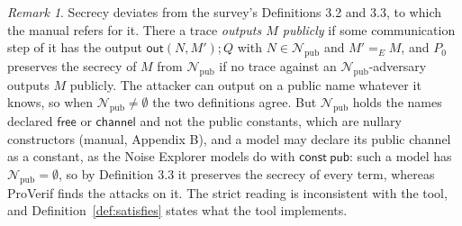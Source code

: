 \documentclass[11pt]{article}
\theoremstyle{definition}
\theoremstyle{plain}
\theoremstyle{remark}
\newtheorem{remark}[definition]{Remark}
\begin{document}
\begin{remark}
Secrecy deviates from the survey's Definitions 3.2 and 3.3, to which the manual refers for it. There a trace \emph{outputs $M$ publicly} if some communication step of it has the output $\mathsf{out}(N,M');Q$ with $N\in\mathcal{N}_{\mathrm{pub}}$ and $M'=_E M$, and $P_0$ preserves the secrecy of $M$ from $\mathcal{N}_{\mathrm{pub}}$ if no trace against an $\mathcal{N}_{\mathrm{pub}}$-adversary outputs $M$ publicly. The attacker can output on a public name whatever it knows, so when $\mathcal{N}_{\mathrm{pub}}\ne\emptyset$ the two definitions agree. But $\mathcal{N}_{\mathrm{pub}}$ holds the names declared $\mathsf{free}$ or $\mathsf{channel}$ and not the public constants, which are nullary constructors (manual, Appendix B), and a model may declare its public channel as a constant, as the Noise Explorer models do with $\mathsf{const}\ \mathsf{pub}$: such a model has $\mathcal{N}_{\mathrm{pub}}=\emptyset$, so by Definition 3.3 it preserves the secrecy of every term, whereas ProVerif finds the attacks on it. The strict reading is inconsistent with the tool, and Definition~\ref{def:satisfies} states what the tool implements.
\end{remark}
\end{document}

